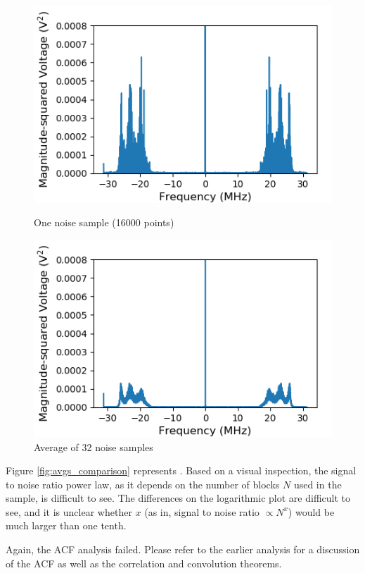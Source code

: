 \documentclass[a4paper]{article}
\begin{document}
\begin{figure}
\centering
\begin{minipage}{.5\textwidth}
	\centering
	\includegraphics[width=.9\linewidth]{5-7/pow1}
	\caption{One noise sample (16000 points)}
	\label{fig:pow1}
\end{minipage}%
\begin{minipage}{.5\textwidth}
	\centering
	\includegraphics[width=.9\linewidth]{5-7/pow_all}
	\caption{Average of 32 noise samples}
	\label{fig:pow_all}
\end{minipage}
\end{figure}

Figure \ref{fig:avgs_comparison} represents . Based on a visual inspection, the signal to noise ratio power law, as it depends on the number of blocks $N$ used in the sample, is difficult to see. The differences on the logarithmic plot are difficult to see, and it is unclear whether $x$ (as in, signal to noise ratio $\propto N^x$) would be much larger than one tenth. 

Again, the ACF analysis failed. Please refer to the earlier analysis for a discussion of the ACF as well as the correlation and convolution theorems.
\end{document}
